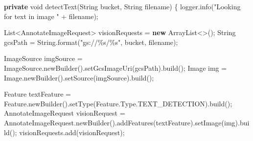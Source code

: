 \documentclass[
]{article}
\newenvironment{Shaded}{}{}
\newcommand{\BuiltInTok}[1]{\textcolor[rgb]{0.00,0.50,0.00}{#1}}
\newcommand{\DataTypeTok}[1]{\textcolor[rgb]{0.56,0.13,0.00}{#1}}
\newcommand{\FunctionTok}[1]{\textcolor[rgb]{0.02,0.16,0.49}{#1}}
\newcommand{\KeywordTok}[1]{\textcolor[rgb]{0.00,0.44,0.13}{\textbf{#1}}}
\newcommand{\NormalTok}[1]{#1}
\newcommand{\OperatorTok}[1]{\textcolor[rgb]{0.40,0.40,0.40}{#1}}
\newcommand{\SpecialCharTok}[1]{\textcolor[rgb]{0.25,0.44,0.63}{#1}}
\newcommand{\StringTok}[1]{\textcolor[rgb]{0.25,0.44,0.63}{#1}}
\begin{document}
\begin{Shaded}
\begin{Highlighting}[]
  \KeywordTok{private} \DataTypeTok{void} \FunctionTok{detectText}\OperatorTok{(}\BuiltInTok{String}\NormalTok{ bucket}\OperatorTok{,} \BuiltInTok{String}\NormalTok{ filename}\OperatorTok{)} \OperatorTok{\{}
\NormalTok{    logger}\OperatorTok{.}\FunctionTok{info}\OperatorTok{(}\StringTok{"Looking for text in image "} \OperatorTok{+}\NormalTok{ filename}\OperatorTok{);}

    \BuiltInTok{List}\OperatorTok{\textless{}}\NormalTok{AnnotateImageRequest}\OperatorTok{\textgreater{}}\NormalTok{ visionRequests }\OperatorTok{=} \KeywordTok{new} \BuiltInTok{ArrayList}\OperatorTok{\textless{}\textgreater{}();}
    \BuiltInTok{String}\NormalTok{ gcsPath }\OperatorTok{=} \BuiltInTok{String}\OperatorTok{.}\FunctionTok{format}\OperatorTok{(}\StringTok{"gs://}\SpecialCharTok{\%s}\StringTok{/}\SpecialCharTok{\%s}\StringTok{"}\OperatorTok{,}\NormalTok{ bucket}\OperatorTok{,}\NormalTok{ filename}\OperatorTok{);}

\NormalTok{    ImageSource imgSource }\OperatorTok{=}\NormalTok{ ImageSource}\OperatorTok{.}\FunctionTok{newBuilder}\OperatorTok{().}\FunctionTok{setGcsImageUri}\OperatorTok{(}\NormalTok{gcsPath}\OperatorTok{).}\FunctionTok{build}\OperatorTok{();}
    \BuiltInTok{Image}\NormalTok{ img }\OperatorTok{=} \BuiltInTok{Image}\OperatorTok{.}\FunctionTok{newBuilder}\OperatorTok{().}\FunctionTok{setSource}\OperatorTok{(}\NormalTok{imgSource}\OperatorTok{).}\FunctionTok{build}\OperatorTok{();}

\NormalTok{    Feature textFeature }\OperatorTok{=}\NormalTok{ Feature}\OperatorTok{.}\FunctionTok{newBuilder}\OperatorTok{().}\FunctionTok{setType}\OperatorTok{(}\NormalTok{Feature}\OperatorTok{.}\FunctionTok{Type}\OperatorTok{.}\FunctionTok{TEXT\_DETECTION}\OperatorTok{).}\FunctionTok{build}\OperatorTok{();}
\NormalTok{    AnnotateImageRequest visionRequest }\OperatorTok{=}
\NormalTok{        AnnotateImageRequest}\OperatorTok{.}\FunctionTok{newBuilder}\OperatorTok{().}\FunctionTok{addFeatures}\OperatorTok{(}\NormalTok{textFeature}\OperatorTok{).}\FunctionTok{setImage}\OperatorTok{(}\NormalTok{img}\OperatorTok{).}\FunctionTok{build}\OperatorTok{();}
\NormalTok{    visionRequests}\OperatorTok{.}\FunctionTok{add}\OperatorTok{(}\NormalTok{visionRequest}\OperatorTok{);}


\end{Highlighting}
\end{Shaded}
\end{document}
